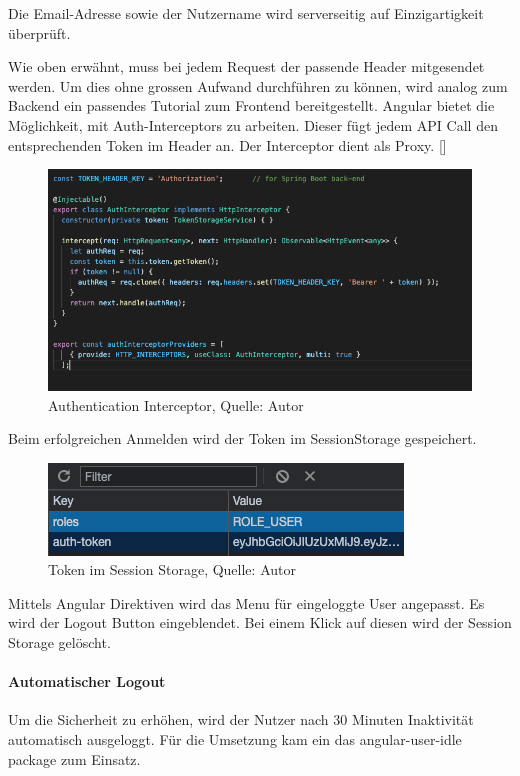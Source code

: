  Die Email-Adresse sowie der Nutzername wird serverseitig auf Einzigartigkeit überprüft. 
 
Wie oben erwähnt, muss bei jedem Request der passende Header mitgesendet werden. Um dies ohne grossen Aufwand durchführen zu können, wird analog zum Backend ein passendes Tutorial zum Frontend bereitgestellt. Angular bietet die Möglichkeit, mit Auth-Interceptors zu arbeiten. Dieser fügt jedem API Call den entsprechenden Token im Header an. Der Interceptor dient als Proxy. [\cite{authAPIAngular}]

\begin{figure}[H]
	\centering
	\includegraphics[width=1\textwidth]{images/authInterceptor.PNG}
	\caption[Authentication Interceptor]{Authentication Interceptor, Quelle: Autor}
	\label{img: authInterceptor}
\end{figure} 
  
Beim erfolgreichen Anmelden wird der Token im \gls{SessionStorage} gespeichert.

\begin{figure}[H]
 	\centering
 	\includegraphics[scale=0.5]{images/sessionStorage.PNG}
 	\caption[Token im Session Storage]{Token im Session Storage, Quelle: Autor}
 	\label{img: sessionStorage}
\end{figure} 
 
 Mittels Angular Direktiven wird das Menu für eingeloggte User angepasst. Es wird der Logout Button eingeblendet. Bei einem Klick auf diesen wird der Session Storage gelöscht. 
 
 \paragraph{Automatischer Logout}
 Um die Sicherheit zu erhöhen, wird der Nutzer nach 30 Minuten Inaktivität automatisch ausgeloggt. Für die Umsetzung kam ein das angular-user-idle package zum Einsatz. 
 
